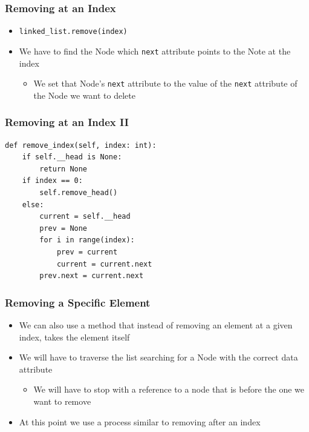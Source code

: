 \documentclass[11pt]{beamer}
\begin{document}
	\begin{frame}
		\frametitle{Removing at an Index}
		\begin{itemize}
			\item \lstinline|linked_list.remove(index)|
			\item We have to find the Node which \texttt{next} attribute points to the Note at the index
			\begin{itemize}
				\item We set that Node's \texttt{next} attribute to the value of the \texttt{next} attribute of the Node we want to delete
			\end{itemize}
		\end{itemize}
		\vspace{0.7cm}
		\begin{center}
		\end{center}
	\end{frame}

	\begin{frame}[fragile]
		\frametitle{Removing at an Index II}
\begin{lstlisting}
def remove_index(self, index: int):
	if self.__head is None:
		return None
	if index == 0:
		self.remove_head()
	else:
		current = self.__head
		prev = None
		for i in range(index):
			prev = current
			current = current.next
		prev.next = current.next
\end{lstlisting}
	\end{frame}

	\begin{frame}
	\frametitle{Removing a Specific Element}
		\begin{itemize}
            \item We can also use a method that instead of removing an element at a given index, takes the element itself
            \item We will have to traverse the list searching for a Node with the correct data attribute
            \begin{itemize}
                \item We will have to stop with a reference to a node that is before the one we want to remove
            \end{itemize}
            \item At this point we use a process similar to removing after an index
        \end{itemize}
     \end{frame}
                
\end{document}
